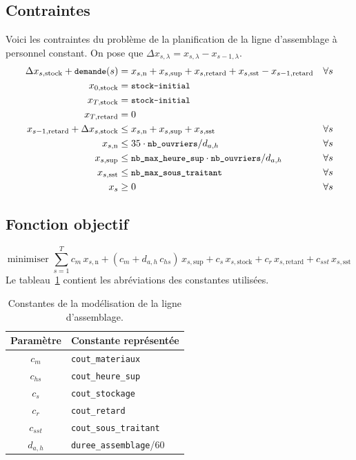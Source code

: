 \documentclass[12pt,oneside,a4paper]{article}
\newcommand{\myX}[2]{x_{#1,\text{#2}}}
\newcommand{\xSemaine}[1]{\myX{s}{#1}}
\newcommand{\xn}{\xSemaine{n}}
\newcommand{\xsup}{\xSemaine{sup}}
\newcommand{\xstock}{\xSemaine{stock}}
\newcommand{\xretard}{\xSemaine{retard}}
\newcommand{\xsst}{\xSemaine{sst}}
\newcommand{\texttts}[1]{{\small\texttt{#1}}}
\begin{document}
\subsection*{Contraintes}
Voici les contraintes du problème de la planification 
de la ligne d’assemblage à personnel constant.
On pose que $\Delta x_{s,\lambda} = x_{s,\lambda} - x_{s-1,\lambda}$.
\begin{align*}
  \Delta\xstock + \texttts{demande}(s) &= \xn + \xsup 
  + \xretard + \xsst - \myX{s-1}{retard} &\forall s \\
  \myX{0}{stock} &= \texttts{stock-initial} \\
  \myX{T}{stock} &= \texttts{stock-initial} \\
  \myX{T}{retard}&= 0 \\
  \myX{s-1}{retard} + \Delta\xstock &\leq \xn + \xsup + \xsst &\forall s \\
  \xn &\leq 35\cdot \texttts{nb\_ouvriers}/ d_{a,h}
  &\forall s \\
  \xsup &\leq \texttts{nb\_max\_heure\_sup}\cdot\texttts{nb\_ouvriers}/ d_{a,h}
  &\forall s \\
  \xsst &\leq \texttts{nb\_max\_sous\_traitant} &\forall s \\
  x_s &\geq 0 &\forall s
\end{align*}

\subsection*{Fonction objectif}
\[
  \mbox{minimiser } 
  \sum_{s=1}^{T} 
  c_m\, \xn + (c_m + d_{a,h} \, c_{hs})\, \xsup
  + c_s\, \xstock + c_r\, \xretard + c_{sst}\, \xsst
\]
Le tableau~\ref{tab:constantesQuestion1} contient les abréviations
des constantes utilisées.
\begin{table}[h]
  \begin{center}
  \begin{tabular}{|c|l|}
    \hline
    Paramètre & Constante représentée \\
    \hline
    \hline
    $c_m$ & \texttt{cout\_materiaux} \\
    \hline
    $c_{hs}$ & \texttt{cout\_heure\_sup} \\
    \hline
    $c_s$ & \texttt{cout\_stockage} \\
    \hline
    $c_r$ & \texttt{cout\_retard} \\
    \hline
    $c_{sst}$ & \texttt{cout\_sous\_traitant} \\
    \hline
    $d_{a,h}$ & \texttt{duree\_assemblage}/60 \\
    \hline
  \end{tabular}
  \caption{Constantes de la modélisation de la ligne d'assemblage.}
  \label{tab:constantesQuestion1}
  \end{center}
\end{table}
\end{document}
